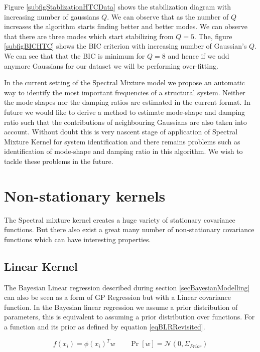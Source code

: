 Figure \ref{subfigStablizationHTCData} shows the stabilization diagram with increasing number of gaussians $Q$. We can observe that as the number of $Q$ increases the algorithm starts finding better and better modes. We can observe that there are three modes which start stabilizing from $Q=5$. The, figure \ref{subfigBICHTC} shows the BIC criterion with increasing number of Gaussian's $Q$. We can see that that the BIC is minimum for $Q=8$ and hence if we add anymore Gaussians for our dataset we will be performing over-fitting. 

In the current setting of the Spectral Mixture model we propose an automatic way to identify the most important frequencies of a structural system. Neither the mode shapes nor the damping ratios are estimated in the current format. In future we would like to derive a method to estimate mode-shape and damping ratio such that the contributions of neighbouring Gaussians are also taken into account. Without doubt this is very nascent stage of application of Spectral Mixture Kernel for system identification and there remains problems such as identification of mode-shape and damping ratio in this algorithm. We wish to tackle these problems in the future. 

\section{Non-stationary kernels}\label{nonStationaryKernels}
The Spectral mixture kernel creates a huge variety of stationary covariance functions. But there also exist a great many number of non-stationary covariance functions which can have interesting properties. 

\subsection{Linear Kernel} \label{subSecCh4LinearKernel}
The Bayesian Linear regression described during section \ref{secBayesianModelling} can also be seen as a form of GP Regression but with a Linear covariance function. In the Bayesian linear regression we assume a prior distribution of parameters, this is equivalent to assuming a prior distribution over functions. For a function and its prior as defined by equation \ref{eqBLRRevisited}.

\begin{equation}\label{eqBLRRevisited}
    f(x_{i}) = \phi(x_{i})^{T}w
\quad \quad \Pr[w] = \mathcal{N}(0, \Sigma_{Prior}) 
\end{equation}

